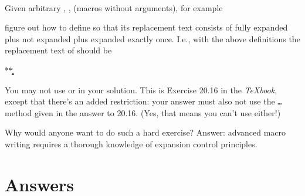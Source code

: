 
\\%

Given arbitrary \cmd{\b}, \cmd{\c}, \cmd{\d} (macros without arguments), for example
\begin{lcode}
       \def\b{\c\c}         \def\c{*}            \def\d{\b\c}
\end{lcode}
figure out how to define \cmd{\a} so that its replacement text consists
of \cmd{\b} fully expanded plus \cmd{\c} not expanded plus \cmd{\d} expanded 
exactly once.
I.e., with the above definitions the replacement text of \cmd{\a}
should be 
\begin{lcode}
       **\c\b\c
\end{lcode}
You may not use \cmd{\the} or \cmd{\noexpand} in your solution. This is Exercise
20.16 in the \emph{TeXbook}, except that there's an added restriction: your
answer must also not use the \cmd{\halign}\texttt{\ldots}\cmd{\span} method given in the
answer to 20.16. (Yes, that means you can't use \cmd{\valign} either!)

Why would anyone want to do such a hard exercise? Answer: advanced
macro writing requires a thorough knowledge of expansion control
principles.

\begin{comment}
[Exercise 2 moved to exercise.002]

[Exercise 3 moved to exercise.003]

Send answers to:

Michael Downes      mjd@math.ams.com (Internet)

A summary will be posted Friday, October 25, 1991.
\end{comment}



\section{Answers}


\\


